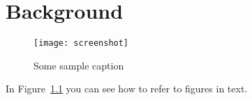 %
% 


\chapter{Background}
\label{sec:background}

\blindtext[3][2]

\begin{figure}[ht]
	\centering
	\texttt{[image: screenshot]}
	\caption{Some sample caption}
	\label{fig:cbc_enc}
\end{figure}


In Figure~\ref{fig:cbc_enc} you can see how to refer to figures in text. \blindtext{}




